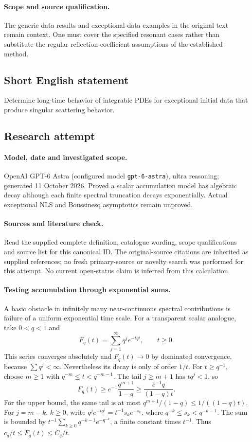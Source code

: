 \documentclass[11pt]{article}
\begin{document}
\paragraph{Scope and source qualification.}The generic-data results and exceptional-data examples in the original text remain context. One must cover the specified resonant cases rather than substitute the regular reflection-coefficient assumptions of the established method.
\subsection{Short English statement}
Determine long-time behavior of integrable PDEs for exceptional initial data that produce singular scattering behavior.
\subsection{Research attempt}
\paragraph{Model, date and investigated scope.}
OpenAI GPT-6 Astra (configured model \texttt{gpt-6-astra}), ultra reasoning; generated 11 October 2026. Proved a scalar accumulation model has algebraic decay although each finite spectral truncation decays exponentially. Actual exceptional NLS and Boussinesq asymptotics remain unproved.

\paragraph{Sources and literature check.}
Read the supplied complete definition, catalogue wording, scope qualifications and source list for this canonical ID. The original-source citations are inherited as supplied references; no fresh primary-source or novelty search was performed for this attempt. No current open-status claim is inferred from this calculation.

\paragraph{Testing accumulation through exponential sums.}A basic obstacle in infinitely many near-continuous spectral contributions is failure of a uniform exponential time scale. For a transparent scalar analogue, take \(0<q<1\) and
\[F_q(t)=\sum_{j=1}^\infty q^j e^{-tq^j},\qquad t\ge0.
\]
This series converges absolutely and \(F_q(t)\to0\) by dominated convergence, because \(\sum q^j<\infty\). Nevertheless its decay is only of order \(1/t\). For \(t\ge q^{-1}\), choose \(m\ge1\) with \(q^{-m}\le t<q^{-m-1}\). The tail \(j\ge m+1\) has \(tq^j<1\), so
\[F_q(t)\ge e^{-1}\frac{q^{m+1}}{1-q}\ge\frac{e^{-1}q}{(1-q)t}.\]
For the upper bound, the same tail is at most \(q^{m+1}/(1-q)\le1/((1-q)t)\). For \(j=m-k\), \(k\ge0\), write \(q^j e^{-tq^j}=t^{-1}s_ke^{-s_k}\), where \(q^{-k}\le s_k<q^{-k-1}\). The sum is bounded by \(t^{-1}\sum_{k\ge0}q^{-k-1}e^{-q^{-k}}\), a finite constant times \(t^{-1}\). Thus \(c_q/t\le F_q(t)\le C_q/t\).
\end{document}
